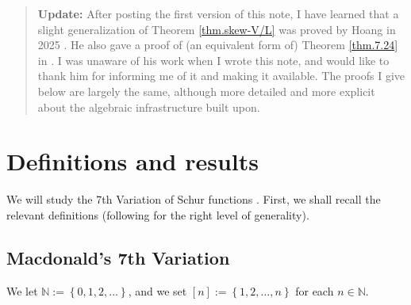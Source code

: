 \documentclass[numbers=enddot,12pt,final,onecolumn,notitlepage]{scrartcl}%
\numberwithin{exer}{section}
\theoremstyle{definition}
\newenvironment{statement}{\begin{quote}}{\end{quote}}
\theoremstyle{plainsl}
\begin{document}
\begin{statement}
\textbf{Update:} After posting the first version of this note, I have learned
that a slight generalization of Theorem \ref{thm.skew-V/L} was proved by Hoang
in 2025 \cite[Theorem 1.24]{Hoang25}. He also gave a proof of (an equivalent
form of) Theorem \ref{thm.7.24} in \cite[Theorem 1.26]{Hoang25}. I was unaware
of his work when I wrote this note, and would like to thank him for informing
me of it and making it available. The proofs I give below are largely the
same, although more detailed and more explicit about the algebraic
infrastructure built upon.
\end{statement}

\section{Definitions and results}

We will study the 7th Variation of Schur functions \cite[7th Variation]%
{Macdon92}. First, we shall recall the relevant definitions (following
\cite[errata]{Macdon92} for the right level of generality).

\subsection{Macdonald's 7th Variation}

We let $\mathbb{N}:=\left\{  0,1,2,\ldots\right\}  $, and we set $\left[
n\right]  :=\left\{  1,2,\ldots,n\right\}  $ for each $n\in\mathbb{N}$.
\end{document}
